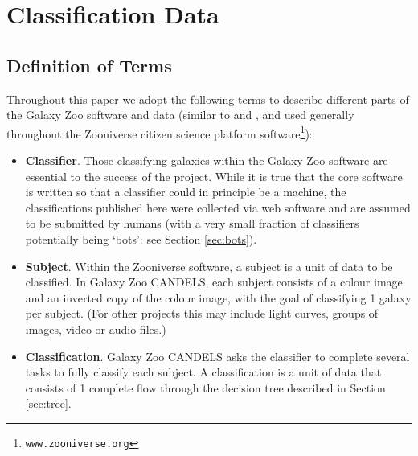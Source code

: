 \documentclass[useAMS,usenatbib]{mn2e}
\begin{document}
{%
%
%
\section{Classification Data}\label{sec:classifications}
%
%


\subsection{Definition of Terms}\label{sec:terms}

Throughout this paper we adopt the following terms to describe different parts of the Galaxy Zoo software and data (similar to \citeauthor{willett13} \citeyear{willett13} and \citeauthor{rsimpson14} \citeyear{rsimpson14}, and used generally throughout the Zooniverse citizen science platform software\footnote{\tt www.zooniverse.org}):

\begin{itemize}
\item \textbf{Classifier}. Those classifying galaxies within the Galaxy Zoo software are essential to the success of the project. While it is true that the core software is written so that a classifier could in principle be a machine, the classifications published here were collected via web software and are assumed to be submitted by humans (with a very small fraction of classifiers potentially being `bots': see Section \ref{sec:bots}).

\item \textbf{Subject}. Within the Zooniverse software, a subject is a unit of data to be classified. 
In Galaxy Zoo CANDELS, each subject consists of a colour image and an inverted copy of the colour image, with the goal of classifying 1 galaxy per subject. (For other projects this may include light curves, groups of images, video or audio files.)

\item \textbf{Classification}. Galaxy Zoo CANDELS asks the classifier to complete several tasks to fully classify each subject. A classification is a unit of data that consists of 1 complete flow through the decision tree described in Section \ref{sec:tree}.


\end{itemize}}
\end{document}
